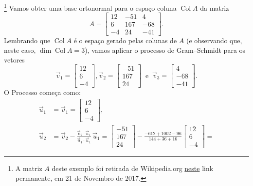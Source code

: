 \documentclass[../livro.tex]{subfiles}  %
\begin{document}
\begin{example}\footnote{A matriz $A$ deste exemplo foi retirada de Wikipedia.org \href{https://en.wikipedia.org/w/index.php?title=QR_decomposition&oldid=810854220}{neste} link permanente, em 21 de Novembro de 2017.}
Vamos obter uma base ortonormal para o espaço coluna $\operatorname{Col} A$ da matriz
\begin{equation}
A =
\begin{bmatrix}
12 & -51 & 4 \\
6 & 167 & -68 \\
-4 & 24 & -41
\end{bmatrix}.
\end{equation} Lembrando que $\operatorname{Col} A$ é o espaço gerado pelas colunas de $A$ (e observando que, neste caso, $\dim \operatorname{Col} A = 3$), vamos aplicar o processo de Gram--Schmidt para os vetores
\begin{equation}
\vec{v}_1 =
\begin{bmatrix}
12 \\
6 \\
-4
\end{bmatrix},
\vec{v}_2 =
\begin{bmatrix}
 -51  \\
 167  \\
 24
\end{bmatrix} \ \text{ e } \ \vec{v}_3 =
\begin{bmatrix}
  4 \\
 -68 \\
 -41
\end{bmatrix}.
\end{equation} O Processo começa como:
\begin{align*}
\vec{u}_1 & = \vec{v}_1 =
\begin{bmatrix}
12 \\
6 \\
-4
\end{bmatrix}, \\
\vec{u}_2 &  = \vec{v}_2 - \frac{\vec{v}_2 \cdot \vec{u}_1}{\vec{u}_1 \cdot \vec{u}_1} \, \vec{u}_1 =
\begin{bmatrix}
 -51  \\
 167  \\
 24
\end{bmatrix} - \frac{-612 +1002 - 96}{144 + 36 + 16}
\begin{bmatrix}
12 \\
6 \\
-4
\end{bmatrix} =

\end{align*}
\end{example}
\end{document}
